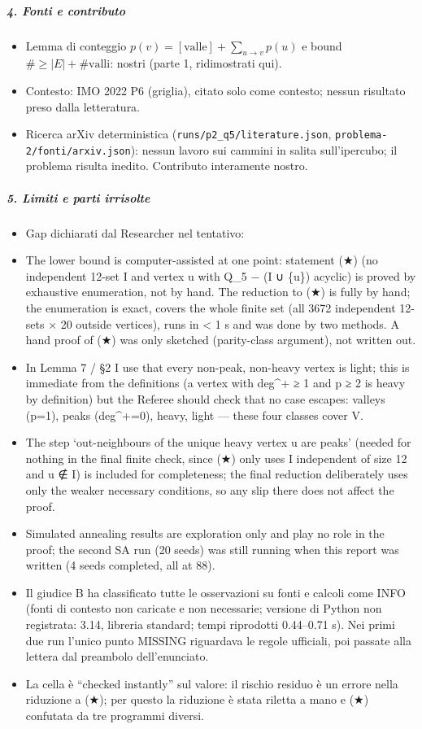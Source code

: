 \documentclass[11pt,a4paper]{article}
\providecommand{\tightlist}{\setlength{\itemsep}{0pt}\setlength{\parskip}{0pt}}
\begin{document}
\subparagraph{4. Fonti e contributo}\label{fonti-e-contributo}

\begin{itemize}
\tightlist
\item
  Lemma di conteggio \(p(v)=[\text{valle}]+\sum_{u\to v}p(u)\) e bound
  \(\#\ge|E|+\#\text{valli}\): nostri (parte 1, ridimostrati qui).
\item
  Contesto: IMO 2022 P6 (griglia), citato solo come contesto; nessun
  risultato preso dalla letteratura.
\item
  Ricerca arXiv deterministica (\texttt{runs/p2\_q5/literature.json},
  \texttt{problema-2/fonti/arxiv.json}): nessun lavoro sui cammini in
  salita sull'ipercubo; il problema risulta inedito. Contributo
  interamente nostro.
\end{itemize}

\subparagraph{5. Limiti e parti
irrisolte}\label{limiti-e-parti-irrisolte}

\begin{itemize}
\tightlist
\item
  Gap dichiarati dal Researcher nel tentativo:
\item
  The lower bound is computer-assisted at one point: statement (★) (no
  independent 12-set I and vertex u with Q\_5 − (I ∪ \{u\}) acyclic) is
  proved by exhaustive enumeration, not by hand. The reduction to (★) is
  fully by hand; the enumeration is exact, covers the whole finite set
  (all 3672 independent 12-sets × 20 outside vertices), runs in
  \textless{} 1 s and was done by two methods. A hand proof of (★) was
  only sketched (parity-class argument), not written out.
\item
  In Lemma 7 / §2 I use that every non-peak, non-heavy vertex is light;
  this is immediate from the definitions (a vertex with deg\^{}+ ≥ 1 and
  p ≥ 2 is heavy by definition) but the Referee should check that no
  case escapes: valleys (p=1), peaks (deg\^{}+=0), heavy, light ---
  these four classes cover V.
\item
  The step `out-neighbours of the unique heavy vertex u are peaks'
  (needed for nothing in the final finite check, since (★) only uses I
  independent of size 12 and u ∉ I) is included for completeness; the
  final reduction deliberately uses only the weaker necessary
  conditions, so any slip there does not affect the proof.
\item
  Simulated annealing results are exploration only and play no role in
  the proof; the second SA run (20 seeds) was still running when this
  report was written (4 seeds completed, all at 88).
\item
  Il giudice B ha classificato tutte le osservazioni su fonti e calcoli
  come INFO (fonti di contesto non caricate e non necessarie; versione
  di Python non registrata: 3.14, libreria standard; tempi riprodotti
  0.44--0.71 s). Nei primi due run l'unico punto MISSING riguardava le
  regole ufficiali, poi passate alla lettera dal preambolo
  dell'enunciato.
\item
  La cella è ``checked instantly'' sul valore: il rischio residuo è un
  errore nella riduzione a (★); per questo la riduzione è stata riletta
  a mano e (★) confutata da tre programmi diversi.
\end{itemize}
\end{document}

